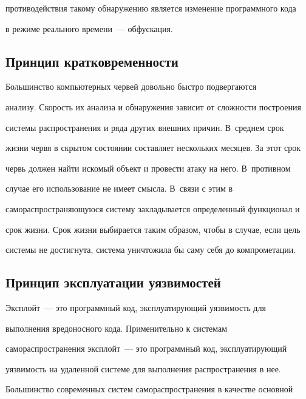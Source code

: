 противодействия такому обнаружению является изменение программного кода 


в режиме реального времени~--- обфускация.


     


\subsection{Принцип кратковременности} %





     Большинство компьютерных червей довольно быстро подвергаются 


анализу. Скорость их анализа и обнаружения зависит от сложности построения 


системы распространения и ряда других внешних причин. В~среднем срок 


жизни червя в скрытом состоянии составляет нескольких месяцев. За этот срок 


червь должен найти искомый объект и провести атаку на него. В~противном 


случае его использование не имеет смысла. В~связи с этим в 


самораспространяющуюся систему закладывается определенный функционал и 


срок жизни. Срок жизни выбирается таким образом, чтобы в случае, если цель 


системы не достигнута, система уничтожила бы саму себя до компрометации. 





\subsection{Принцип эксплуатации уязвимостей } %


     


     Эксплойт~--- это программный код, эксплуатирующий уязвимость для 


выполнения вредоносного кода. Применительно к системам 


самораспространения эксплойт~--- это программный код, эксплуатирующий 


уязвимость на удаленной системе для выполнения распространения в нее. 


Большинство современных систем самораспространения в качестве основной 


